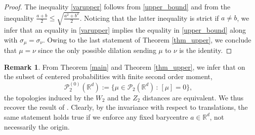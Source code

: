 \documentclass[11pt,reqno]{amsart}
\theoremstyle{definition}
\newtheorem{remark}[theorem]{Remark}
\numberwithin{equation}{section}
\newcommand{\R}{\mathbb{R}}
\newcommand{\Rd}{{\R^d}}
\begin{document}
\begin{proof} The inequality \eqref{varupper} follows from \eqref{upper_bound} and from the inequality $\frac {a+b}{2} \le \sqrt{\frac{a^2 + b^2}{2}}$.
 Noticing that the latter inequality is strict if $a\not=b$, we infer that an equality in \eqref{varupper} implies the equality in 
 \eqref{upper_bound} along with  $\sigma_\mu=\sigma_\nu$. Owing to the last statement of Theorem \ref{thm_upper}, we conclude that $\mu=\nu$  since the only possible dilation sending $\mu$ to $\nu$ is the identity.
\end{proof}

\begin{remark}\label{equivalence} From Theorem \ref{main} and Theorem \ref{thm_upper}, we infer that on the subset  of centered probabilities  with finite second order moment,
    \begin{equation*}
        \mathcal{P}_2^{(0)}(\Rd) := \Big\{ \mu \in \mathcal{P}_2(\Rd) \, : \, [\mu] =0 \Big\},
    \end{equation*}
    the topologies induced by the $W_2$ and the $Z_2$ distances are equivalent. We thus recover the result of \cite{belili2000}. Clearly, by the invariance with respect to translations, the same statement holds true if we enforce any fixed barycentre $a\in \Rd$, not necessarily the origin.
\end{remark} 
\end{document}
